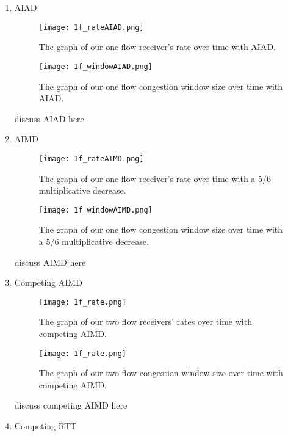 \documentclass[11pt]{article}
\begin{document}
\begin{enumerate}
\item AIAD

\begin{figure}[H]
\caption{The graph of our one flow receiver's rate over time with AIAD.}
  \label{figure13}
    \centering
    \texttt{[image: 1f\_rateAIAD.png]}
\end{figure}

\begin{figure}[H]
\caption{The graph of our one flow congestion window size over time with AIAD.}
  \label{figure14}
    \centering
    \texttt{[image: 1f\_windowAIAD.png]}
\end{figure}


discuss AIAD here

\bigskip
\item AIMD

\begin{figure}[H]
\caption{The graph of our one flow receiver's rate over time with a 5/6 multiplicative decrease.}
  \label{figure15}
    \centering
    \texttt{[image: 1f\_rateAIMD.png]}
\end{figure}

\begin{figure}[H]
\caption{The graph of our one flow congestion window size over time with a 5/6 multiplicative decrease.}
  \label{figure16}
    \centering
    \texttt{[image: 1f\_windowAIMD.png]}
\end{figure}

discuss AIMD here

\bigskip
\item Competing AIMD

\begin{figure}[H]
\caption{The graph of our two flow receivers' rates over time with competing AIMD.}
  \label{figure15}
    \centering
    \texttt{[image: 1f\_rate.png]}
\end{figure}

\begin{figure}[H]
\caption{The graph of our two flow congestion window size over time with competing AIMD.}
  \label{figure16}
    \centering
    \texttt{[image: 1f\_rate.png]}
\end{figure}

discuss competing AIMD here

\bigskip
\item Competing RTT


\end{enumerate}
\end{document}
